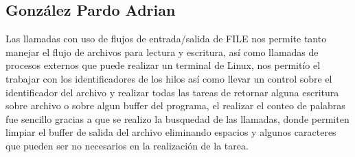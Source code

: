 \documentclass[11pt,a4paper]{article}
\begin{document}
\subsection{González Pardo Adrian}
Las llamadas con uso de flujos de entrada/salida de FILE nos permite tanto manejar el flujo de archivos para lectura y escritura, así como llamadas de procesos externos que puede realizar un terminal de Linux, nos permitío el trabajar con los identificadores de los hilos así como llevar un control sobre el identificador del archivo y realizar todas las tareas de retornar alguna escritura sobre archivo o sobre algun buffer del programa, el realizar el conteo de palabras fue sencillo gracias a que se realizo la busquedad de las llamadas, donde permiten limpiar el buffer de salida del archivo eliminando espacios y algunos caracteres que pueden ser no necesarios en la realización de la tarea.
\end{document}
